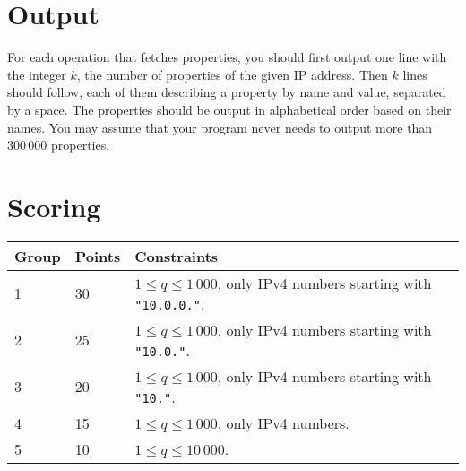\section*{Output}
For each operation that fetches properties, you should first output one line with the integer $k$, the number of properties of the given IP address.
Then $k$ lines should follow, each of them describing a property by name and value, separated by a space.
The properties should be output in alphabetical order based on their names.
You may assume that your program never needs to output more than $300\,000$ properties.

\section*{Scoring}
\begin{tabular}{|l|l|l|}
\hline
Group & Points & Constraints \\ \hline
1     & 30   & $1 \leq q \leq 1\,000$, only IPv4 numbers starting with \texttt{"10.0.0."}. \\ \hline
2     & 25   & $1 \leq q \leq 1\,000$, only IPv4 numbers starting with \texttt{"10.0."}. \\ \hline
3     & 20   & $1 \leq q \leq 1\,000$, only IPv4 numbers starting with \texttt{"10."}. \\ \hline
4     & 15   & $1 \leq q \leq 1\,000$, only IPv4 numbers. \\ \hline
5     & 10   & $1 \leq q \leq 10\,000$. \\ \hline
\end{tabular}
